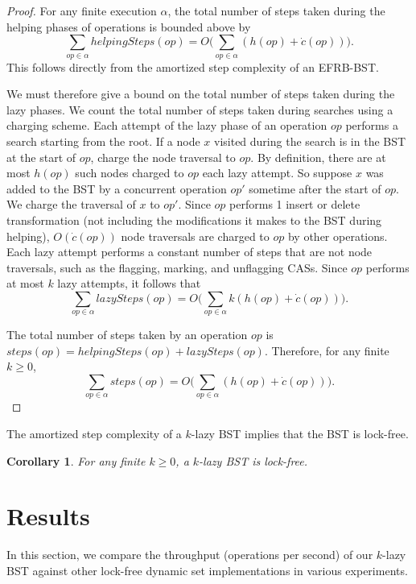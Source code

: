\documentclass[letterpaper]{article}
\newtheorem{corollary}[theorem]{Corollary}
\begin{document}
\begin{proof}
For any finite execution $\alpha$, the total number of steps taken during the helping phases of operations is bounded above by
\begin{equation*}
\sum_{op\in\alpha} helpingSteps(op) = O\bigg(\sum_{op\in\alpha} (h(op) + \dot{c}(op))\bigg).
\end{equation*}
This follows directly from the amortized step complexity of an EFRB-BST. 

We must therefore give a bound on the total number of steps taken during the lazy phases. We count the total number of steps taken during searches using a charging scheme.  Each attempt of the lazy phase of an operation $op$ performs a search starting from the root. If a node $x$ visited during the search is in the BST at the start of $op$, charge the node traversal to $op$. By definition, there are at most $h(op)$ such nodes charged to $op$ each lazy attempt. So suppose $x$ was added to the BST by a concurrent operation $op'$ sometime after the start of $op$. We charge the traversal of $x$ to $op'$. Since $op$ performs 1 insert or delete transformation (not including the modifications it makes to the BST during helping), $O(\dot{c}(op))$ node traversals are charged to $op$ by other operations. Each lazy attempt performs a constant number of steps that are not node traversals, such as the flagging, marking, and unflagging CASs. Since $op$ performs at most $k$ lazy attempts, it follows that
\begin{equation*}
\sum_{op\in\alpha} lazySteps(op) = O\bigg(\sum_{op\in\alpha} k(h(op) + \dot{c}(op))\bigg).
\end{equation*}

The total number of steps taken by an operation $op$ is $steps(op) = helpingSteps(op) + lazySteps(op)$. Therefore, for any finite $k \geq 0$,
\begin{equation*}
\sum_{op\in\alpha} steps(op) = O\bigg(\sum_{op\in\alpha} (h(op) + \dot{c}(op))\bigg).
\end{equation*}
\end{proof}

The amortized step complexity of a $k$-lazy BST implies that the BST is lock-free.
\begin{corollary}
For any finite $k \geq 0$, a $k$-lazy BST is lock-free.
\end{corollary}

\section{Results}\label{section_results}
In this section, we compare the throughput (operations per second) of our $k$-lazy BST against other lock-free dynamic set implementations in various experiments.
\end{document}
